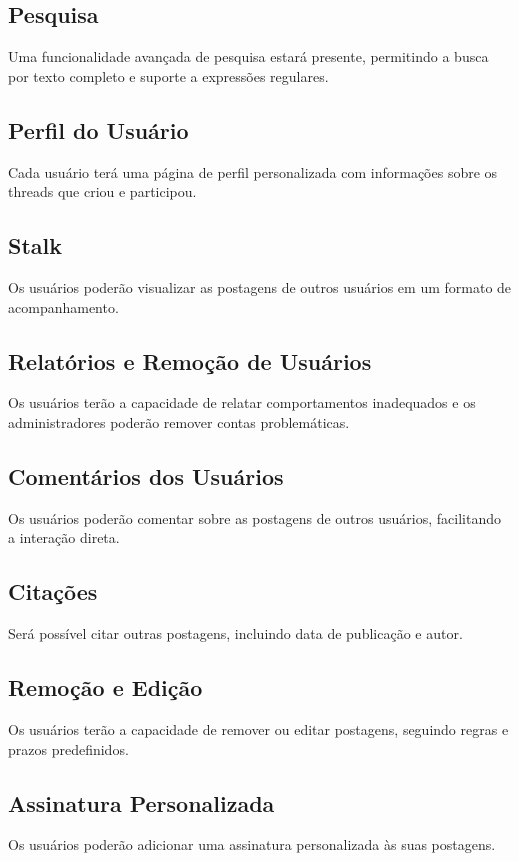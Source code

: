 \documentclass{article}
\begin{document}
  \subsection{Pesquisa}
  Uma funcionalidade avançada de pesquisa estará presente, permitindo a busca por texto completo e suporte a expressões regulares.
  
  \subsection{Perfil do Usuário}
  Cada usuário terá uma página de perfil personalizada com informações sobre os threads que criou e participou.
  
  \subsection{Stalk}
  Os usuários poderão visualizar as postagens de outros usuários em um formato de acompanhamento.
  
  \subsection{Relatórios e Remoção de Usuários}
  Os usuários terão a capacidade de relatar comportamentos inadequados e os administradores poderão remover contas problemáticas.
  
  \subsection{Comentários dos Usuários}
  Os usuários poderão comentar sobre as postagens de outros usuários, facilitando a interação direta.
  
  \subsection{Citações}
  Será possível citar outras postagens, incluindo data de publicação e autor.
  
  \subsection{Remoção e Edição}
  Os usuários terão a capacidade de remover ou editar postagens, seguindo regras e prazos predefinidos.
  
  \subsection{Assinatura Personalizada}
  Os usuários poderão adicionar uma assinatura personalizada às suas postagens.
  
\end{document}
